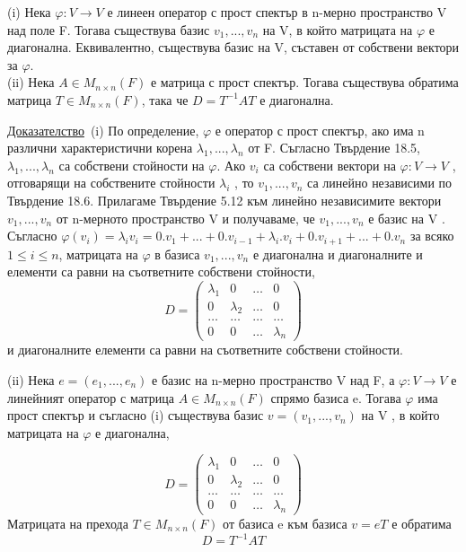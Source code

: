 \documentclass{article}
\newcommand{\dok}{\underline{Доказателство}\  }
\newcommand{\tvurdenie}[2]{
    \begin{tcolorbox}[title = #1 ,colframe = blue!70!black, colback = blue!10!white]
        #2
    \end{tcolorbox}
}
\begin{document}
\tvurdenie{Твърдение 18.8}{
    (i) Нека $\varphi : V \rightarrow V$ е линеен оператор с прост спектър в n-мерно пространство
    V над поле F. Тогава съществува базис $v_1, ... , v_n$ на V, в който матрицата
    на $\varphi$ е диагонална. Еквивалентно, съществува базис на V, съставен от
    собствени вектори за  $\varphi$. \\
    (ii) Нека  $A \in M_{n\times n}(F)$ е матрица с прост спектър. Тогава съществува
    обратима матрица  $T \in M_{n\times n}(F)$, така че $D = T^{-1}AT$ е диагонална.
}
\dok(i) По определение, $\varphi$ е оператор с прост спектър, ако
има n различни характеристични корена $\lambda_1, ... , \lambda_n$ от F. Съгласно Твърдение
18.5, $\lambda_1, . . . , \lambda_n$ са собствени стойности на $\varphi$. Ако $v_i$ са собствени
вектори на  $\varphi : V \rightarrow V$ , отговарящи на собствените стойности $\lambda_i$
, то $v_1, ... , v_n$ са линейно независими по Твърдение 18.6. Прилагаме Твърдение 5.12 към
линейно независимите вектори $v_1, ... , v_n$ от n-мерното пространство V и получаваме, че
$v_1, ... , v_n$ е базис на V .
Съгласно $\varphi(v_i) = \lambda_iv_i = 0.v_1+...+0.v_{i-1}+\lambda_i.v_i+0.v_{i+1}+... + 0.v_n$ за всяко $1 \leq i \leq n$, матрицата на $\varphi$ в базиса $v_1, ... , v_n$ е диагонална
и диагоналните и елементи са равни на съответните собствени стойности,
\[
    D=\left(\begin{array}{cccc}
            \lambda_1 & 0         & \dots & 0         \\
            0         & \lambda_2 & \dots & 0         \\
            \dots     & \dots     & \dots & \dots     \\
            0         & 0         & \dots & \lambda_n
        \end{array}\right)
\]
и диагоналните елементи са равни на съответните собствени стойности.

(ii) Нека $e = (e_1, . . . , e_n)$ е базис на n-мерно пространство V над F, а $\varphi : V \rightarrow V$
е линейният оператор с матрица $A \in M_{n\times n}(F)$ спрямо базиса e. Тогава $\varphi$ има
прост спектър и съгласно (i) съществува базис $v = (v_1, . . . , v_n)$ на V , в който
матрицата на $\varphi$ е диагонална,

\[
    D=\left(\begin{array}{cccc}
            \lambda_1 & 0         & \dots & 0         \\
            0         & \lambda_2 & \dots & 0         \\
            \dots     & \dots     & \dots & \dots     \\
            0         & 0         & \dots & \lambda_n
        \end{array}\right)
\]
Матрицата на прехода $T \in M_{n\times n}(F)$ от базиса e към базиса $v = eT$ е обратима
\[
    D=T^{-1}AT
\]
\end{document}
